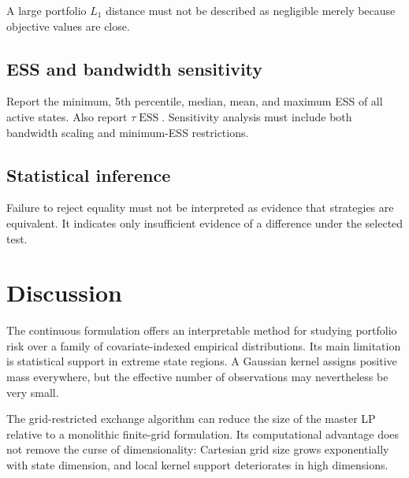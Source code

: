 \documentclass[11pt,a4paper]{article}
\theoremstyle{definition}
\theoremstyle{remark}
\newcommand{\ESS}{\operatorname{ESS}}
\begin{document}
A large portfolio \(L_1\) distance must not be described as negligible merely
because objective values are close.

\subsection{ESS and bandwidth sensitivity}

Report the minimum, 5th percentile, median, mean, and maximum ESS of all active
states. Also report \(\tau\ESS\). Sensitivity analysis must include both
bandwidth scaling and minimum-ESS restrictions.

\subsection{Statistical inference}


Failure to reject equality must not be interpreted as evidence that strategies
are equivalent. It indicates only insufficient evidence of a difference under
the selected test.

\section{Discussion}

The continuous formulation offers an interpretable method for studying
portfolio risk over a family of covariate-indexed empirical distributions.
Its main limitation is statistical support in extreme state regions. A
Gaussian kernel assigns positive mass everywhere, but the effective number of
observations may nevertheless be very small.

The grid-restricted exchange algorithm can reduce the size of the master LP
relative to a monolithic finite-grid formulation. Its computational advantage
does not remove the curse of dimensionality: Cartesian grid size grows
exponentially with state dimension, and local kernel support deteriorates in
high dimensions.
\end{document}
